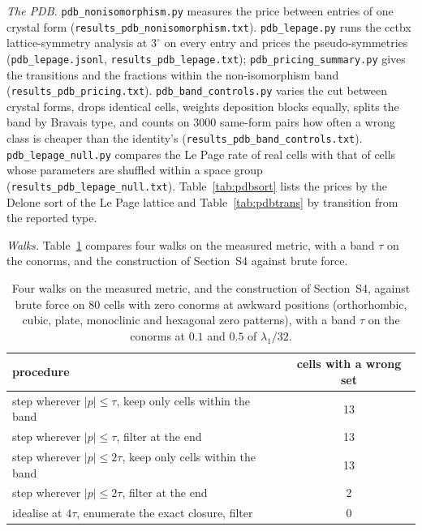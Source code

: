 \documentclass[preprint,pdf]{iucr}          %
\begin{document}
{\sloppy\emph{The PDB.} \texttt{pdb\_nonisomorphism.py} measures the price between entries of one crystal form (\texttt{results\_pdb\_nonisomorphism.txt}). \texttt{pdb\_lepage.py} runs the cctbx lattice-symmetry analysis at $3^\circ$ on every entry and prices the pseudo-symmetries (\texttt{pdb\_lepage.jsonl}, \texttt{results\_pdb\_lepage.txt}); \texttt{pdb\_pricing\_summary.py} gives the transitions and the fractions within the non-isomorphism band (\texttt{results\_pdb\_pricing.txt}). \texttt{pdb\_band\_controls.py} varies the cut between crystal forms, drops identical cells, weights deposition blocks equally, splits the band by Bravais type, and counts on 3000 same-form pairs how often a wrong class is cheaper than the identity's (\texttt{results\_pdb\_band\_controls.txt}). \texttt{pdb\_lepage\_null.py} compares the Le Page rate of real cells with that of cells whose parameters are shuffled within a space group (\texttt{results\_pdb\_lepage\_null.txt}). Table~\ref{tab:pdbsort} lists the prices by the Delone sort of the Le Page lattice and Table~\ref{tab:pdbtrans} by transition from the reported type.\par}

\emph{Walks.} Table~\ref{tab:walks} compares four walks on the measured metric, with a band $\tau$ on the conorms, and the construction of Section~S4 against brute force.

\begin{table}
\caption{Four walks on the measured metric, and the construction of Section~S4, against brute force on 80 cells with zero conorms at awkward positions (orthorhombic, cubic, plate, monoclinic and hexagonal zero patterns), with a band $\tau$ on the conorms at $0.1$ and $0.5$ of $\lambda_1/32$.}
\label{tab:walks}
\begin{tabular}{lc}
\toprule
procedure & cells with a wrong set \\
\midrule
step wherever $|p|\le\tau$, keep only cells within the band & 13 \\
step wherever $|p|\le\tau$, filter at the end & 13 \\
step wherever $|p|\le2\tau$, keep only cells within the band & 13 \\
step wherever $|p|\le2\tau$, filter at the end & 2 \\
idealise at $4\tau$, enumerate the exact closure, filter & 0 \\
\bottomrule
\end{tabular}
\end{table}
\end{document}
